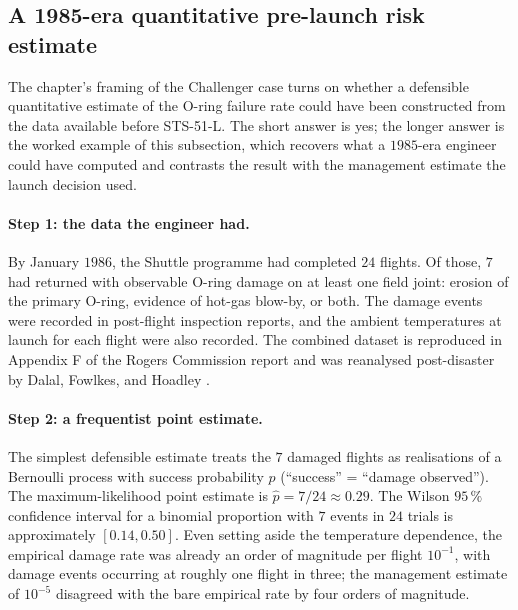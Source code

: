 \subsection{A 1985-era quantitative pre-launch risk estimate}

The chapter's framing of the Challenger case turns on whether a
defensible quantitative estimate of the O-ring failure rate could
have been constructed from the data available before STS-51-L. The
short answer is yes; the longer answer is the worked example of
this subsection, which recovers what a $1985$-era engineer could
have computed and contrasts the result with the management estimate
the launch decision used.

\paragraph{Step 1: the data the engineer had.}
By January $1986$, the Shuttle programme had completed $24$ flights.
Of those, $7$ had returned with observable O-ring damage on at least
one field joint: erosion of the primary O-ring, evidence of hot-gas
blow-by, or both. The damage events were recorded in post-flight
inspection reports, and the ambient temperatures at launch for each
flight were also recorded. The combined dataset is reproduced in
Appendix F of the Rogers Commission report and was reanalysed
post-disaster by Dalal, Fowlkes, and Hoadley
\cite{paper:ch09-feynman-appendix-f,
ch09-paper:dalal-challenger-1989}.

\paragraph{Step 2: a frequentist point estimate.}
The simplest defensible estimate treats the $7$ damaged flights as
realisations of a Bernoulli process with success probability $p$
(``success'' = ``damage observed''). The maximum-likelihood point
estimate is $\hat p = 7/24 \approx 0.29$. The Wilson $95\,\%$
confidence interval for a binomial proportion with $7$ events in
$24$ trials is approximately $[0.14, 0.50]$. Even setting aside the
temperature dependence, the empirical damage rate was already an
order of magnitude per flight $10^{-1}$, with damage events
occurring at roughly one flight in three; the management estimate
of $10^{-5}$ disagreed with the bare empirical rate by four orders
of magnitude.

